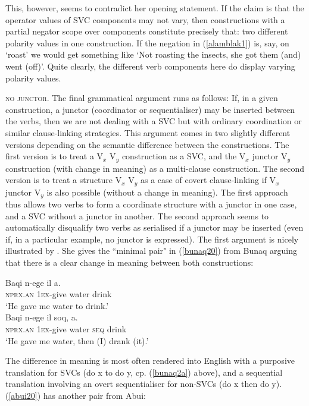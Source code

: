 This, however, seems to contradict her opening statement. If the claim is that the operator values of SVC components may not vary, then constructions with a partial negator scope over components constitute precisely that: two different polarity values in one construction. If the negation in (\ref{alamblak1}) is, say, on `roast' we would get something like `Not roasting the insects, she got them (and) went (off)'. Quite clearly, the different verb components here do display varying polarity values.

\textsc{no junctor}. The final grammatical argument runs as follows: If, in a given construction, a junctor (coordinator or sequentialiser) may be inserted between the verbs, then we are not dealing with a SVC but with ordinary coordination or similar clause-linking strategies. This argument comes in two slightly different versions depending on the semantic difference between the constructions. The first version is to treat a V$_x$ V$_y$ construction as a SVC, and the V$_x$ junctor V$_y$ construction (with change in meaning) as a multi-clause construction. The second version is to treat a structure V$_x$ V$_y$ as a case of covert clause-linking if V$_x$ junctor V$_y$ is also possible (without a change in meaning). The first approach thus allows two verbs to form a coordinate structure with a junctor in one case, and a SVC without a junctor in another. The second approach seems to automatically disqualify two verbs as serialised if a junctor may be inserted (even if, in a particular example, no junctor is expressed). The first argument is nicely illustrated by \citet{schapper2009bunaq}. She gives the ``minimal pair" in (\ref{bunaq20}) from Bunaq arguing that there is a clear change in meaning between both constructions:

\ea \label{bunaq20} 
\ea \label{bunaq2a}
\gll Baqi n-ege il a. \\
\textsc{nprx}.\textsc{an} \textsc{1}\textsc{ex}-give water drink \\
\glft `He gave me water to drink.’ \\ 
\ex
\gll Baqi n-ege il soq, a. \\ 
\textsc{nprx}.\textsc{an} \textsc{1}\textsc{ex}-give water \textsc{seq} drink \\
\glft `He gave me water, then (I) drank (it).’\\ 
\z
\z

The difference in meaning is most often rendered into English with a purposive translation for SVCs (do x to do y, cp. (\ref{bunaq2a}) above), and a sequential translation involving an overt sequentialiser for non-SVCs (do x then do y). (\ref{abui20}) has another pair from Abui:

